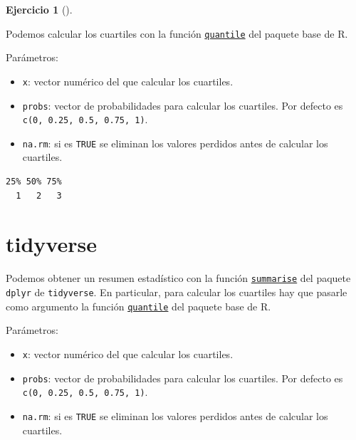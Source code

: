 \documentclass[
  spanish,
  a4paper,
]{scrreport}
\newenvironment{Shaded}{\begin{snugshade}}{\end{snugshade}}
\newcommand{\AttributeTok}[1]{\textcolor[rgb]{0.40,0.45,0.13}{#1}}
\newcommand{\FloatTok}[1]{\textcolor[rgb]{0.68,0.00,0.00}{#1}}
\newcommand{\FunctionTok}[1]{\textcolor[rgb]{0.28,0.35,0.67}{#1}}
\newcommand{\NormalTok}[1]{\textcolor[rgb]{0.00,0.23,0.31}{#1}}
\newcommand{\SpecialCharTok}[1]{\textcolor[rgb]{0.37,0.37,0.37}{#1}}
\providecommand{\tightlist}{%
  \setlength{\itemsep}{0pt}\setlength{\parskip}{0pt}}
\theoremstyle{definition}
\newtheorem{exercise}{Ejercicio}[chapter]
\theoremstyle{remark}
\begin{document}
\begin{exercise}[]
\begin{enumerate}
\begin{tcolorbox}
  Podemos calcular los cuartiles con la función
  \href{https://www.rdocumentation.org/packages/base/versions/3.6.2/topics/quantile}{\texttt{quantile}}
  del paquete base de R.

  Parámetros:

  \begin{itemize}
  \tightlist
  \item
    \texttt{x}: vector numérico del que calcular los cuartiles.
  \item
    \texttt{probs}: vector de probabilidades para calcular los
    cuartiles. Por defecto es \texttt{c(0,\ 0.25,\ 0.5,\ 0.75,\ 1)}.
  \item
    \texttt{na.rm}: si es \texttt{TRUE} se eliminan los valores perdidos
    antes de calcular los cuartiles.
  \end{itemize}

\begin{Shaded}
\end{Shaded}

\begin{verbatim}
25% 50% 75% 
  1   2   3 
\end{verbatim}

  \section{tidyverse}

  Podemos obtener un resumen estadístico con la función
  \href{https://dplyr.tidyverse.org/reference/summarise.html}{\texttt{summarise}}
  del paquete \texttt{dplyr} de \texttt{tidyverse}. En particular, para
  calcular los cuartiles hay que pasarle como argumento la función
  \href{https://www.rdocumentation.org/packages/base/versions/3.6.2/topics/quantile}{\texttt{quantile}}
  del paquete base de R.

  Parámetros:

  \begin{itemize}
  \tightlist
  \item
    \texttt{x}: vector numérico del que calcular los cuartiles.
  \item
    \texttt{probs}: vector de probabilidades para calcular los
    cuartiles. Por defecto es \texttt{c(0,\ 0.25,\ 0.5,\ 0.75,\ 1)}.
  \item
    \texttt{na.rm}: si es \texttt{TRUE} se eliminan los valores perdidos
    antes de calcular los cuartiles.
  \end{itemize}


\end{tcolorbox}
\end{enumerate}
\end{exercise}
\end{document}
